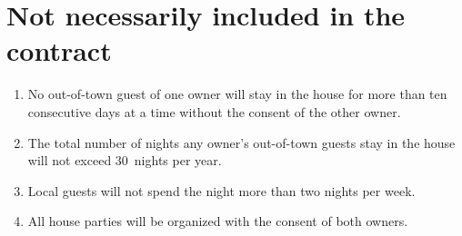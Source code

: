 \documentclass[12pt]{article}
\begin{document}
\section{Not necessarily included in the contract}
\begin{enumerate}
\item No out-of-town guest of one owner
will stay in the house for more than ten 
consecutive days at a time without the consent of the other owner.

\item The total number of nights any owner's out-of-town guests stay
in the house will not exceed 30~nights per year.

\item Local guests will not spend the night more than two nights per week.

\item All house parties will be organized with the consent of both
owners.


\end{enumerate}
\end{document}
